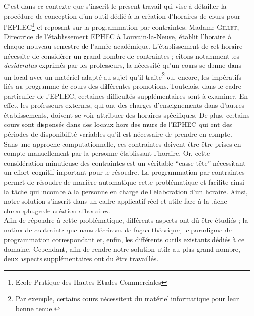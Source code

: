 \newline
\indent
C'est dans ce contexte que s'inscrit le présent travail qui vise à détailler la procédure de conception d'un outil dédié à la création d'horaires de cours pour l'EPHEC\footnote{Ecole Pratique des Hautes Etudes Commerciales} et reposant sur la programmation par contraintes.
\newline
\indent
Madame \textsc{Gillet}, Directrice de l'établissement EPHEC à Louvain-la-Neuve, établit l'horaire à chaque nouveau semestre de l'année académique. L'établissement de cet horaire nécessite de considérer un grand nombre de contraintes ; citons notamment les \textit{desideratas} exprimés par les professeurs, la nécessité qu'un cours se donne dans un local avec un matériel adapté au sujet qu'il traite\footnote{Par exemple, certains cours nécessitent du matériel informatique pour leur bonne tenue.} ou, encore, les impératifs liés au programme de cours des différentes promotions.
\newline
\indent
Toutefois, dans le cadre particulier de l'EPHEC, certaines difficultés supplémentaires sont à examiner. En effet, les professeurs externes, qui ont des charges d'enseignements dans d'autres établissements, doivent se voir attribuer des horaires spécifiques.  De plus, certains cours sont dispensés dans des locaux hors des murs de l'EPHEC qui ont des périodes de disponibilité variables qu'il est nécessaire de prendre en compte.\\
\newline
\indent
Sans une approche computationnelle, ces contraintes doivent être  être prises en compte manuellement par la personne établissant l'horaire. Or, cette considération minutieuse des contraintes est un véritable \enquote{casse-tête} nécessitant un effort cognitif important pour le résoudre. 
\newline
\indent
La programmation par contraintes permet de résoudre de manière automatique cette problématique et facilite ainsi la tâche qui incombe à la personne en charge de l'élaboration d'un horaire. Ainsi, notre solution s'inscrit dans un cadre applicatif réel et  utile face à la tâche chronophage de création d'horaires. \\
\newline
\indent
Afin de répondre à cette problématique, différents aspects ont dû être étudiés ; la notion de contrainte que nous décrirons de façon théorique, le paradigme de programmation correspondant et, enfin,  les différents outils existants dédiés à ce domaine. Cependant, afin de rendre notre solution utile au plus grand nombre, deux aspects supplémentaires ont du être travaillés.
